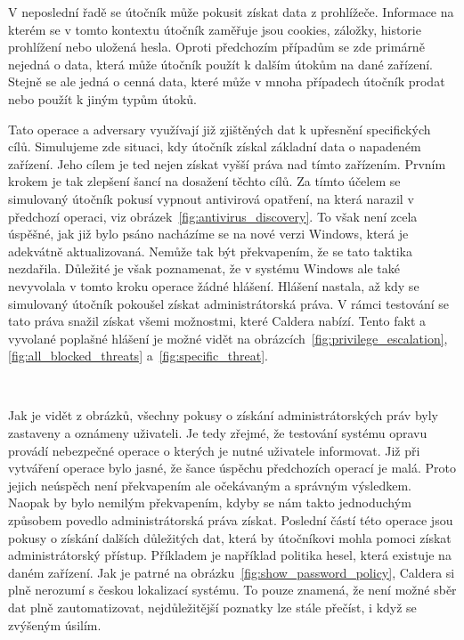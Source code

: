 
V neposlední řadě se útočník může pokusit získat data z prohlížeče.
Informace na kterém se v tomto kontextu útočník zaměřuje jsou cookies, záložky, historie prohlížení nebo uložená hesla.
Oproti předchozím případům se zde primárně nejedná o data, která může útočník použít k dalším útokům na dané zařízení.
Stejně se ale jedná o cenná data, které může v mnoha případech útočník prodat nebo použít k jiným typům útoků.

Tato operace a adversary využívají již zjištěných dat k upřesnění specifických cílů.
Simulujeme zde situaci, kdy útočník získal základní data o napadeném zařízení.
Jeho cílem je ted nejen získat vyšší práva nad tímto zařízením.
Prvním krokem je tak zlepšení šancí na dosažení těchto cílů.
Za tímto účelem se simulovaný útočník pokusí vypnout antivirová opatření, na která narazil v předchozí operaci, viz obrázek~\ref{fig:antivirus_discovery}.
To však není zcela úspěšné, jak již bylo psáno nacházíme se na nové verzi Windows, která je adekvátně aktualizovaná.
Nemůže tak být překvapením, že se tato taktika nezdařila.
Důležité je však poznamenat, že v systému Windows ale také nevyvolala v tomto kroku operace žádné hlášení.
Hlášení nastala, až kdy se simulovaný útočník pokoušel získat administrátorská práva.
V rámci testování se tato práva snažil získat všemi možnostmi, které Caldera nabízí.
Tento fakt a vyvolané poplašné hlášení je možné vidět na obrázcích~\ref{fig:privilege_escalation},\ref{fig:all_blocked_threats} a~\ref{fig:specific_threat}.%

~
~
~

Jak je vidět z obrázků, všechny pokusy o získání administrátorských práv byly zastaveny a oznámeny uživateli.
Je tedy zřejmé, že testování systému opravu provádí nebezpečné operace o kterých je nutné uživatele informovat.
Již při vytváření operace bylo jasné, že šance úspěchu předchozích operací je malá.
Proto jejich neúspěch není překvapením ale očekávaným a správným výsledkem.
Naopak by bylo nemilým překvapením, kdyby se nám takto jednoduchým způsobem povedlo administrátorská práva získat.
Poslední částí této operace jsou pokusy o získání dalších důležitých dat, která by útočníkovi mohla pomoci získat administrátorský přístup.
Příkladem je například politika hesel, která existuje na daném zařízení.
Jak je patrné na obrázku~\ref{fig:show_password_policy}, Caldera si plně nerozumí s českou lokalizací systému.
To pouze znamená, že není možné sběr dat plně zautomatizovat, nejdůležitější poznatky lze stále přečíst, i když se zvýšeným úsilím.

